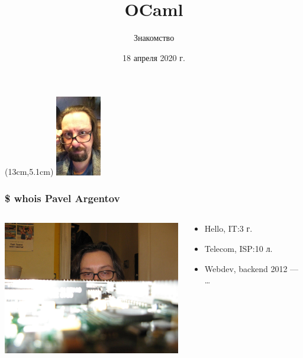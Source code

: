 

\title{OCaml}
\subtitle{Знакомство}

\date{18 апреля 2020 г.}



\begin{frame}
  \titlepage{}

  \begin{textblock*}{4cm} (13cm,5.1cm)
  \includegraphics[height=3.5cm]{./images/ag.png}
  \end{textblock*}
\end{frame}

\begin{frame}
  \frametitle{\$ whois Pavel Argentov}
  \large
  \vspace{8mm}
  \begin{columns}
    \begin{column}{8cm}
      \includegraphics[width=8cm,keepaspectratio]{./images/ag_cisco.jpg}
    \end{column}

    \begin{column}{5cm}
      \begin{itemize}
        \item Hello, IT:\@ 3 г.
        \item Telecom, ISP:\@ 10 л.
        \item Webdev, backend 2012 --- \dots
      \end{itemize}
    \end{column}
  \end{columns}
\end{frame}

